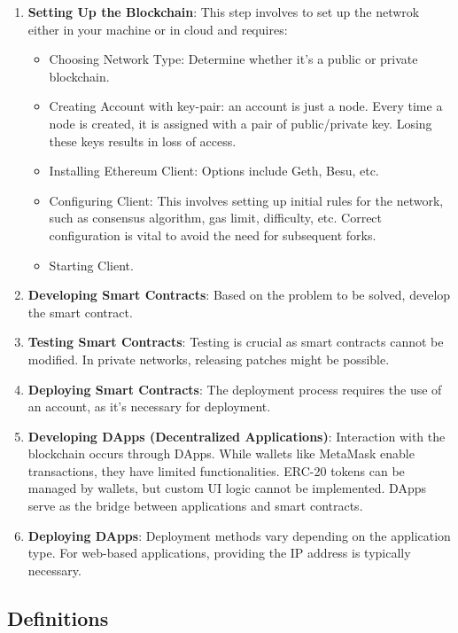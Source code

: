 \begin{enumerate}
    \item \label{ls: set-blockchian} \textbf{Setting Up the Blockchain}: This step involves to set up the netwrok either in your machine or in cloud and requires:
    
    \begin{itemize}
     \setlength\itemsep{1em}
        \item Choosing Network Type: Determine whether it's a public or private blockchain.
        \item Creating Account with key-pair: an account is just a node. Every time a node is created, it is assigned with a pair of public/private key. Losing these keys results in loss of access.
        \item Installing Ethereum Client: Options include Geth, Besu, etc.
        \item Configuring Client: This involves setting up initial rules for the network, such as consensus algorithm, gas limit, difficulty, etc. Correct configuration is vital to avoid the need for subsequent forks.
        \item Starting Client.
    \end{itemize}
    \item \textbf{Developing Smart Contracts}: Based on the problem to be solved, develop the smart contract.
    \item \textbf{Testing Smart Contracts}: Testing is crucial as smart contracts cannot be modified. In private networks, releasing patches might be possible.
    \item \textbf{Deploying Smart Contracts}: The deployment process requires the use of an account, as it's necessary for deployment.
    \item \textbf{Developing DApps (Decentralized Applications)}:  Interaction with the blockchain occurs through DApps. While wallets like MetaMask enable transactions, they have limited functionalities. ERC-20 tokens can be managed by wallets, but custom UI logic cannot be implemented. DApps serve as the bridge between applications and smart contracts.
    \item \textbf{Deploying DApps}: Deployment methods vary depending on the application type. For web-based applications, providing the IP address is typically necessary.
\end{enumerate}

\subsection{Definitions}

